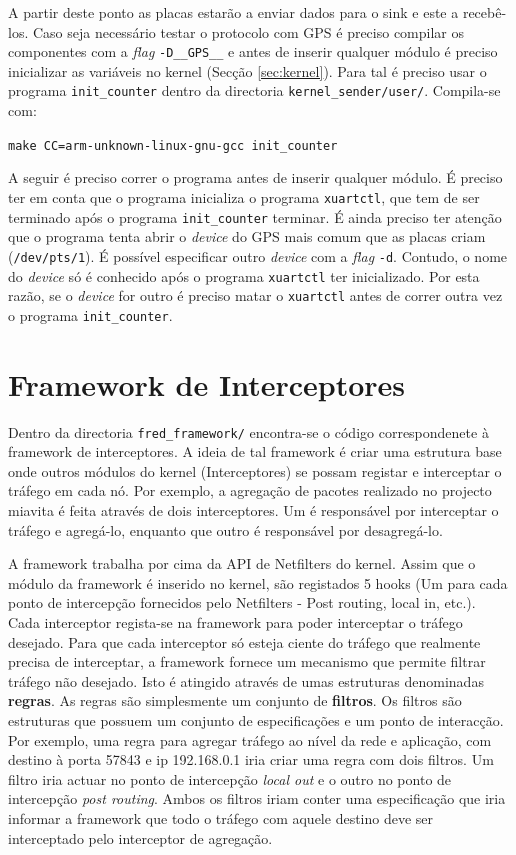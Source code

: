 \documentclass[10pt,a4paper,oneside]{book}
\begin{document}
	A partir deste ponto as placas estarão a enviar dados para o sink e este a recebê-los. Caso seja necessário testar o protocolo com GPS é preciso compilar os componentes com a \emph{flag} {\tt -D\_\_GPS\_\_} e antes de inserir qualquer módulo é preciso inicializar as variáveis no kernel (Secção \ref{sec:kernel}). Para tal é preciso usar o programa {\tt init\_counter} dentro da directoria {\tt kernel\_sender/user/}. Compila-se com:
        
        \begin{center}
          {\tt make CC=arm-unknown-linux-gnu-gcc init\_counter}
        \end{center}
	
        A seguir é preciso correr o programa antes de inserir qualquer módulo. É preciso ter em conta que o programa inicializa o programa {\tt xuartctl}, que tem de ser terminado após o programa {\tt init\_counter} terminar. É ainda preciso ter atenção que o programa tenta abrir o \emph{device} do GPS mais comum que as placas criam ({\tt /dev/pts/1}). É possível especificar outro \emph{device} com a \emph{flag} {\tt -d}. Contudo, o nome do \emph{device} só é conhecido após o programa {\tt xuartctl} ter inicializado. Por esta razão, se o \emph{device} for outro é preciso matar o {\tt xuartctl} antes de correr outra vez o programa {\tt init\_counter}.

\chapter{Framework de Interceptores}

  Dentro da directoria {\tt fred\_framework/} encontra-se o código correspondenete à framework de interceptores. A ideia de tal framework é criar uma estrutura base onde outros módulos do kernel (Interceptores) se possam registar e interceptar o tráfego em cada nó. Por exemplo, a agregação de pacotes realizado no projecto miavita é feita através de dois interceptores. Um é responsável por interceptar o tráfego e agregá-lo, enquanto que outro é responsável por desagregá-lo.

  A framework trabalha por cima da API de Netfilters do kernel. Assim que o módulo da framework é inserido no kernel, são registados 5 hooks (Um para cada ponto de intercepção fornecidos pelo Netfilters - Post routing, local in, etc.). Cada interceptor regista-se na framework para poder interceptar o tráfego desejado. Para que cada interceptor só esteja ciente do tráfego que realmente precisa de interceptar, a framework fornece um mecanismo que permite filtrar tráfego não desejado. Isto é atingido através de umas estruturas denominadas \textbf{regras}. As regras são simplesmente um conjunto de \textbf{filtros}. Os filtros são estruturas que possuem um conjunto de especificações e um ponto de interacção. Por exemplo, uma regra para agregar tráfego ao nível da rede e aplicação, com destino à porta 57843 e ip 192.168.0.1 iria criar uma regra com dois filtros. Um filtro iria actuar no ponto de intercepção \emph{local out} e o outro no ponto de intercepção \emph{post routing}. Ambos os filtros iriam conter uma especificação que iria informar a framework que todo o tráfego com aquele destino deve ser interceptado pelo interceptor de agregação.
  
\end{document}
